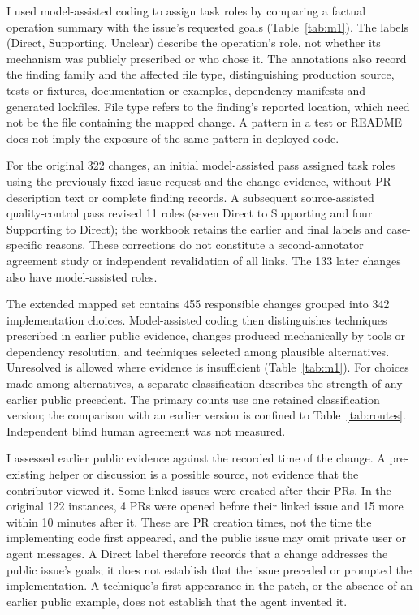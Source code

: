 \documentclass[acmsmall,screen,nonacm]{acmart}
\begin{document}
I used model-assisted coding to assign task roles by comparing a factual operation summary with the issue's requested goals (Table~\ref{tab:m1}). The labels (Direct, Supporting, Unclear) describe the operation's role, not whether its mechanism was publicly prescribed or who chose it. The annotations also record the finding family and the affected file type, distinguishing production source, tests or fixtures, documentation or examples, dependency manifests and generated lockfiles. File type refers to the finding's reported location, which need not be the file containing the mapped change. A pattern in a test or README does not imply the exposure of the same pattern in deployed code.

For the original 322 changes, an initial model-assisted pass assigned task roles using the previously fixed issue request and the change evidence, without PR-description text or complete finding records. A subsequent source-assisted quality-control pass revised 11 roles (seven Direct to Supporting and four Supporting to Direct); the workbook retains the earlier and final labels and case-specific reasons. These corrections do not constitute a second-annotator agreement study or independent revalidation of all links. The 133 later changes also have model-assisted roles.

The extended mapped set contains 455 responsible changes grouped into 342 implementation choices. Model-assisted coding then distinguishes techniques prescribed in earlier public evidence, changes produced mechanically by tools or dependency resolution, and techniques selected among plausible alternatives. Unresolved is allowed where evidence is insufficient (Table~\ref{tab:m1}). For choices made among alternatives, a separate classification describes the strength of any earlier public precedent. The primary counts use one retained classification version; the comparison with an earlier version is confined to Table~\ref{tab:routes}. Independent blind human agreement was not measured.

I assessed earlier public evidence against the recorded time of the change. A pre-existing helper or discussion is a possible source, not evidence that the contributor viewed it. Some linked issues were created after their PRs. In the original 122 instances, 4 PRs were opened before their linked issue and 15 more within 10 minutes after it. These are PR creation times, not the time the implementing code first appeared, and the public issue may omit private user or agent messages. A Direct label therefore records that a change addresses the public issue's goals; it does not establish that the issue preceded or prompted the implementation. A technique's first appearance in the patch, or the absence of an earlier public example, does not establish that the agent invented it.
\end{document}

